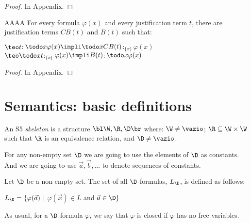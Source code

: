 \begin{proof}
\qquad In Appendix.
\end{proof}



\begin{pro}
AAAA For every formula $\varphi(x)$ and every justification term $t$, there are justification terms $CB(t)$ and $B(t)$ such that: 
	\begin{center}
		$\teo t$$:$$\todo x \varphi(x) \impli \todo x CB(t)$$:_{\{x\}}$$\varphi(x)$\\
		
		$\teo \todo x t$$:_{\{x\}}$$\varphi(x) \impli B(t)$$:$$\todo x \varphi(x)$
	\end{center}
\end{pro}



\begin{proof}
	\qquad In Appendix.
\end{proof}







\section{Semantics: basic definitions}


\begin{defn}
An S5 \textit{skeleton} is a structure $\bl \W, \R, \D \br$ where: $\W \ne \vazio$; $\R \subseteq \W \times \W$ such that $\R$ is an equivalence relation, and $\D \ne \vazio$.
\end{defn}


\qquad For any non-empty set $\D$ we are going to use the elements of $\D$ as constants. And  we are going to use $\vec{a}, \vec{b},  \dots$ to denote sequences of constants.

\begin{defn}
Let $\D$ be a non-empty set. The set of all $\D$-formulas, $L_{\D}$, is defined as follows:

\begin{center}
	$L_{\D} = \{\varphi (\vec{a})$ $|$  $\varphi(\vec{x}) \in L$ and $\vec{a} \in \D\}$
\end{center}

\end{defn}

\qquad As usual, for a $\D$-formula $\varphi$, we say that $\varphi$ is closed if  $\varphi$ has no free-variables.

